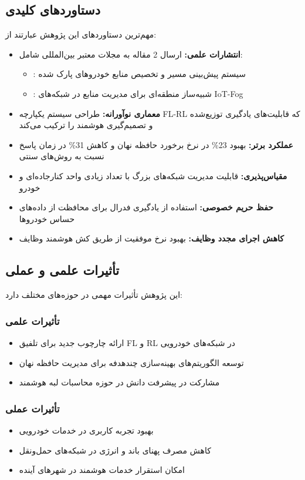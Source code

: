 \documentclass[11pt]{article}
\begin{document}
\subsection{دستاوردهای کلیدی}

مهم‌ترین دستاوردهای این پژوهش عبارتند از:

\begin{itemize}
\item \textbf{انتشارات علمی:} ارسال 2 مقاله به مجلات معتبر بین‌المللی شامل:
  \begin{itemize}
  \item {}: سیستم پیش‌بینی مسیر و تخصیص منابع خودروهای پارک شده
  \item {}: شبیه‌ساز منطقه‌ای برای مدیریت منابع در شبکه‌های IoT-Fog
  \end{itemize}
\item \textbf{معماری نوآورانه:} طراحی سیستم یکپارچه FL-RL که قابلیت‌های یادگیری توزیع‌شده و تصمیم‌گیری هوشمند را ترکیب می‌کند
\item \textbf{عملکرد برتر:} بهبود 23\% در نرخ برخورد حافظه نهان و کاهش 31\% در زمان پاسخ نسبت به روش‌های سنتی
\item \textbf{مقیاس‌پذیری:} قابلیت مدیریت شبکه‌های بزرگ با تعداد زیادی واحد کنارجاده‌ای و خودرو
\item \textbf{حفظ حریم خصوصی:} استفاده از یادگیری فدرال برای محافظت از داده‌های حساس خودروها
\item \textbf{کاهش اجرای مجدد وظایف:} بهبود نرخ موفقیت از طریق کش هوشمند وظایف
\end{itemize}

\subsection{تأثیرات علمی و عملی}

این پژوهش تأثیرات مهمی در حوزه‌های مختلف دارد:

\subsubsection{تأثیرات علمی}
\begin{itemize}
\item ارائه چارچوب جدید برای تلفیق FL و RL در شبکه‌های خودرویی
\item توسعه الگوریتم‌های بهینه‌سازی چندهدفه برای مدیریت حافظه نهان
\item مشارکت در پیشرفت دانش در حوزه محاسبات لبه هوشمند
\end{itemize}

\subsubsection{تأثیرات عملی}
\begin{itemize}
\item بهبود تجربه کاربری در خدمات خودرویی
\item کاهش مصرف پهنای باند و انرژی در شبکه‌های حمل‌ونقل
\item امکان استقرار خدمات هوشمند در شهرهای آینده
\end{itemize}
\end{document}
